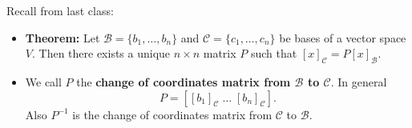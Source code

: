 


%
%
%

% 

%
\thispagestyle{fancy}


Recall from last class:

\begin{itemize}
\item {\bf Theorem:} Let $\mathcal{B}=\{b_1, \dots, b_n\}$ and $\mathcal{C}=\{c_1, \dots, c_n\}$ be bases of a vector space $V$. Then there exists a unique $n\times n$ matrix $P$ such that $[x]_{\mathcal{C}}=P [x]_{\mathcal{B}}$.
\item We call $P$ the {\bf change of coordinates matrix from $\mathcal{B}$ to $\mathcal{C}$}. In general $$P= [[b_1]_\mathcal{C} \; \dots \; [b_n]_\mathcal{C}].$$ Also $P^{-1}$ is the change of coordinates matrix from $\mathcal{C}$ to $\mathcal{B}$.

\end{itemize}



\newpage

